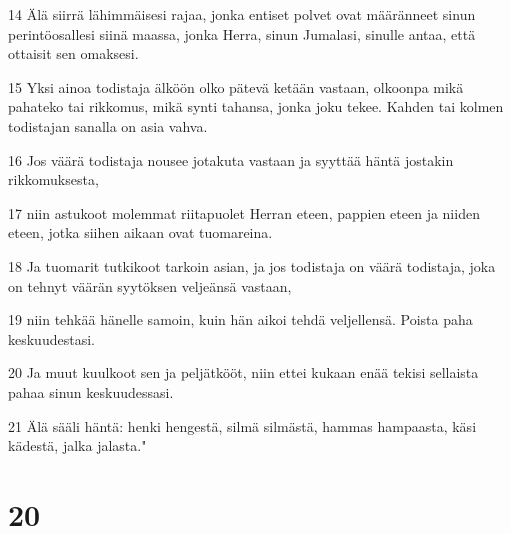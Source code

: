 \par 14 Älä siirrä lähimmäisesi rajaa, jonka entiset polvet ovat määränneet sinun perintöosallesi siinä maassa, jonka Herra, sinun Jumalasi, sinulle antaa, että ottaisit sen omaksesi.
\par 15 Yksi ainoa todistaja älköön olko pätevä ketään vastaan, olkoonpa mikä pahateko tai rikkomus, mikä synti tahansa, jonka joku tekee. Kahden tai kolmen todistajan sanalla on asia vahva.
\par 16 Jos väärä todistaja nousee jotakuta vastaan ja syyttää häntä jostakin rikkomuksesta,
\par 17 niin astukoot molemmat riitapuolet Herran eteen, pappien eteen ja niiden eteen, jotka siihen aikaan ovat tuomareina.
\par 18 Ja tuomarit tutkikoot tarkoin asian, ja jos todistaja on väärä todistaja, joka on tehnyt väärän syytöksen veljeänsä vastaan,
\par 19 niin tehkää hänelle samoin, kuin hän aikoi tehdä veljellensä. Poista paha keskuudestasi.
\par 20 Ja muut kuulkoot sen ja peljätkööt, niin ettei kukaan enää tekisi sellaista pahaa sinun keskuudessasi.
\par 21 Älä sääli häntä: henki hengestä, silmä silmästä, hammas hampaasta, käsi kädestä, jalka jalasta."

\chapter{20}

